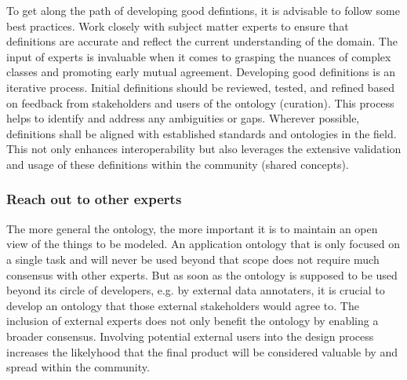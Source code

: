 To get along the path of developing good defintions, it is advisable to follow some best practices. 
Work closely with subject matter experts to ensure that definitions are accurate and reflect the current understanding of the domain. The input of experts is invaluable when it comes to grasping the nuances of complex classes and promoting early mutual agreement. Developing good definitions is an iterative process. Initial definitions should be reviewed, tested, and refined based on feedback from stakeholders and users of the ontology (curation). This process helps to identify and address any ambiguities or gaps.
Wherever possible, definitions shall be aligned with established standards and ontologies in the field. This not only enhances interoperability but also leverages the extensive validation and usage of these definitions within the community (shared concepts).


\subsubsection{Reach out to other experts}

The more general the ontology, the more important it is to maintain an open view of the things to be modeled. An application ontology that is only focused on a single task and will never be used beyond that scope does not require much consensus with other experts. But as soon as the ontology is supposed to be used beyond its circle of developers, e.g. by external data annotaters, it is crucial to develop an ontology that those external stakeholders would agree to. The inclusion of external experts does not only benefit the ontology by enabling a broader consensus. Involving potential external users into the design process increases the likelyhood that the final product will be considered valuable by and spread within the community.

